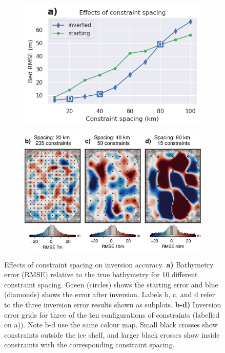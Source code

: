 \begin{figure}[!ht]
\captionsetup[subfigure]{labelformat=empty}
  \centering
    \begin{subfigure}[t]{.6\textwidth}
        \centering
        \includegraphics[width=\textwidth]{figures/chp3/chp3_Ross_Sea_constraints_ensemble_graph.png}
        \caption{}
    \end{subfigure}
    \begin{subfigure}[t]{.8\textwidth}
        \centering
        \includegraphics[width=\textwidth]{figures/chp3/chp3_Ross_Sea_constraints_ensemble_errors.png}
        \caption{}
    \end{subfigure}
  \caption[Constraint spacing effects]{Effects of constraint spacing on inversion accuracy. \textbf{a)} Bathymetry error (RMSE) relative to the true bathymetry for 10 different constraint spacing. Green (circles) shows the starting error and blue (diamonds) shows the error after inversion. Labels b, c, and d refer to the three inversion error results shown as subplots. \textbf{b-d)} Inversion error grids for three of the ten configurations of constraints (labelled on a)). Note b-d use the same colour map. Small black crosses show constraints outside the ice shelf, and larger black crosses show inside constraints with the corresponding constraint spacing.}
    \label{fig:chp3_Ross_Sea_constraints_ensemble}
\end{figure}

